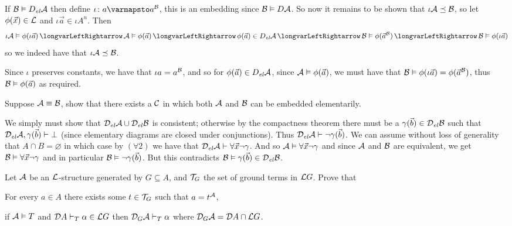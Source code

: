 \eexerc

If ${\cal B}\vDash D_{\it el}{\cal A}$ then define $\iota\colon a\varmapsto a^{\cal B}$, this is an embedding since ${\cal B}\vDash D{\cal A}$.
So now it remains to be shown that $\iota{\cal A}\preceq{\cal B}$, so let $\phi(\vec x)\in{\cal L}$ and $\iota\vec a\in\iota A^n$.
Then
$$ \iota{\cal A}\vDash\phi(\iota\vec a)\iff{\cal A}\vDash\phi(\vec a)\iff\phi(\vec a)\in D_{\it el}{\cal A}\iff{\cal B}\vDash\phi(\vec a^{\cal B})\iff {\cal B}\vDash\phi(\iota\vec a) $$
so we indeed have that $\iota{\cal A}\preceq{\cal B}$.

Since $\iota$ preserves constants, we have that $\iota a=a^{\cal B}$, and so for $\phi(\vec a)\in D_{\it el}{\cal A}$, since ${\cal A}\vDash\phi(\vec a)$, we must have that
${\cal B}\vDash\phi(\iota\vec a)=\phi(\vec a^{\cal B})$, thus ${\cal B}\vDash\phi(\vec a)$ as required.

\bexerc

    Suppose ${\cal A}\equiv{\cal B}$, show that there exists a ${\cal C}$ in which both ${\cal A}$ and ${\cal B}$ can be embedded elementarily.

\eexerc

We simply must show that ${\cal D}_{\it el}{\cal A}\cup{\cal D}_{\it el}{\cal B}$ is consistent; otherwise by the compactness theorem there must be a $\gamma(\vec b)\in{\cal D}_{\it el}{\cal B}$ such that
${\cal D}_{\it el}{\cal A},\gamma(\vec b)\vdash\bot$ (since elementary diagrams are closed under conjunctions).
Thus ${\cal D}_{\it el}{\cal A}\vdash\neg\gamma(\vec b)$.
We can assume without loss of generality that $A\cap B=\varnothing$ in which case by $(\forall2)$ we have that ${\cal D}_{\it el}{\cal A}\vdash\forall\vec x\neg\gamma$.
And so ${\cal A}\vDash\forall\vec x\neg\gamma$ and since ${\cal A}$ and ${\cal B}$ are equivalent, we get ${\cal B}\vDash\forall\vec x\neg\gamma$ and in particular ${\cal B}\vDash\neg\gamma(\vec b)$.
But this contradicts ${\cal B}\vDash\gamma(\vec b)\in{\cal D}_{\it el}{\cal B}$.

\bexerc

    Let ${\cal A}$ be an ${\cal L}$-structure generated by $G\subseteq A$, and ${\cal T}_G$ the set of ground terms in ${\cal L}G$.
    Prove that
    \benum
        \item For every $a\in A$ there exists some $t\in{\cal T}_G$ such that $a=t^{\cal A}$,
        \item if ${\cal A}\vDash T$ and ${\cal D}A\vdash_T\alpha\in{\cal L}G$ then ${\cal D}_G{\cal A}\vdash_T\alpha$ where ${\cal D}_G{\cal A}={\cal D}A\cap{\cal L}G$.
    \eenum

